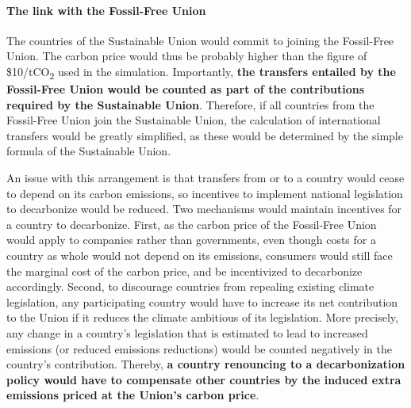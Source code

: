 \documentclass[12pt,english]{article}
\begin{document}
\paragraph{The link with the Fossil-Free Union}
The countries of the Sustainable Union would commit to joining the Fossil-Free Union. The carbon price would thus be probably higher than the figure of \$10/tCO\textsubscript{2} used in the simulation. Importantly, \textbf{the transfers entailed by the Fossil-Free Union would be counted as part of the contributions required by the Sustainable Union}. Therefore, if all countries from the Fossil-Free Union join the Sustainable Union, the calculation of international transfers would be greatly simplified, as these would be determined by the simple formula of the Sustainable Union. 

An issue with this arrangement is that transfers from or to a country would cease to depend on its carbon emissions, so incentives to implement national legislation to decarbonize would be reduced. Two mechanisms would maintain incentives for a country to decarbonize. First, as the carbon price of the Fossil-Free Union would apply to companies rather than governments, even though costs for a country as whole would not depend on its emissions, consumers would still face the marginal cost of the carbon price, and be incentivized to decarbonize accordingly. Second, to discourage countries from repealing existing climate legislation, any participating country would have to increase its net contribution to the Union if it reduces the climate ambitious of its legislation. More precisely, any change in a country's legislation that is estimated to lead to increased emissions (or reduced emissions reductions) would be counted negatively in the country's contribution. Thereby, \textbf{a country renouncing to a decarbonization policy would have to compensate other countries by the induced extra emissions priced at the Union's carbon price}.
\end{document}
